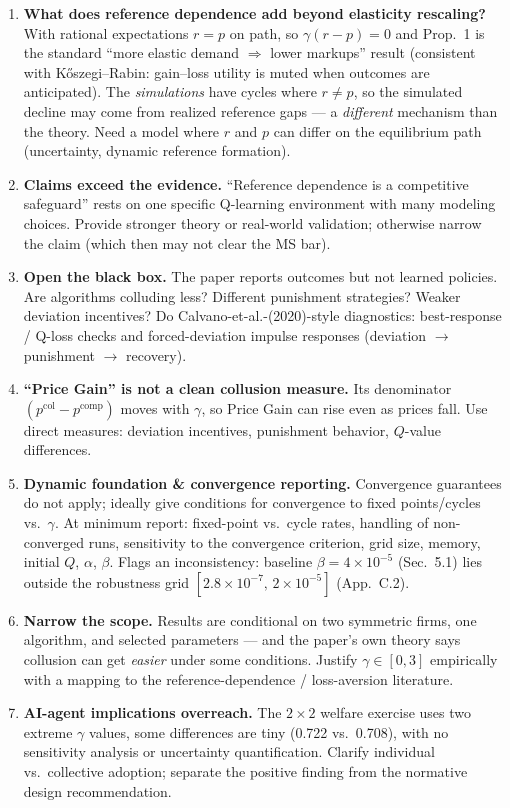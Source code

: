 \documentclass[11pt]{article}
\newcommand{\crit}[1]{\textcolor{crit}{\textbf{#1}}}
\newcommand{\med}[1]{\textcolor{med}{#1}}
\begin{document}
\begin{enumerate}[label=\textbf{R3.\arabic*.}]
  \item \crit{What does reference dependence add beyond elasticity rescaling?} With rational
        expectations $r=p$ on path, so $\gamma(r-p)=0$ and Prop.~1 is the standard ``more elastic demand
        $\Rightarrow$ lower markups'' result (consistent with K\H{o}szegi--Rabin: gain--loss utility is
        muted when outcomes are anticipated). The \emph{simulations} have cycles where $r\neq p$, so the
        simulated decline may come from realized reference gaps --- a \emph{different} mechanism than the
        theory. Need a model where $r$ and $p$ can differ on the equilibrium path (uncertainty, dynamic
        reference formation).
  \item \textbf{Claims exceed the evidence.} ``Reference dependence is a competitive safeguard'' rests
        on one specific Q-learning environment with many modeling choices. Provide stronger theory or
        real-world validation; otherwise narrow the claim (which then may not clear the MS bar).
  \item \textbf{Open the black box.} The paper reports outcomes but not learned policies. Are algorithms
        colluding less? Different punishment strategies? Weaker deviation incentives? Do
        Calvano-et-al.-(2020)-style diagnostics: best-response / Q-loss checks and forced-deviation
        impulse responses (deviation $\to$ punishment $\to$ recovery).
  \item \textbf{``Price Gain'' is not a clean collusion measure.} Its denominator
        $(p^{\text{col}}-p^{\text{comp}})$ moves with $\gamma$, so Price Gain can rise even as prices
        fall. Use direct measures: deviation incentives, punishment behavior, $Q$-value differences.
  \item \textbf{Dynamic foundation \& convergence reporting.} Convergence guarantees do not apply;
        ideally give conditions for convergence to fixed points/cycles vs.\ $\gamma$. At minimum report:
        fixed-point vs.\ cycle rates, handling of non-converged runs, sensitivity to the convergence
        criterion, grid size, memory, initial $Q$, $\alpha$, $\beta$.
        \med{Flags an inconsistency:} baseline $\beta=4\times10^{-5}$ (Sec.~5.1) lies outside the
        robustness grid $[2.8\times10^{-7},\,2\times10^{-5}]$ (App.~C.2).
  \item \textbf{Narrow the scope.} Results are conditional on two symmetric firms, one algorithm, and
        selected parameters --- and the paper's own theory says collusion can get \emph{easier} under
        some conditions. Justify $\gamma\in[0,3]$ empirically with a mapping to the
        reference-dependence / loss-aversion literature.
  \item \textbf{AI-agent implications overreach.} The $2\times2$ welfare exercise uses two extreme
        $\gamma$ values, some differences are tiny (0.722 vs.\ 0.708), with no sensitivity analysis or
        uncertainty quantification. Clarify individual vs.\ collective adoption; separate the positive
        finding from the normative design recommendation.
\end{enumerate}
\end{document}
